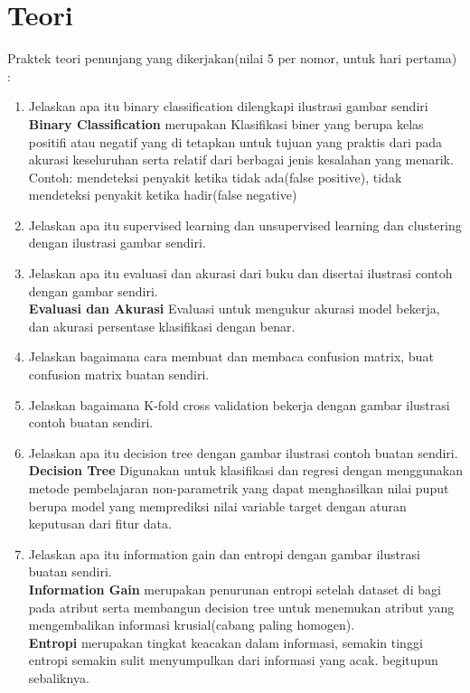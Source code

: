 \section{Teori}
Praktek teori penunjang yang dikerjakan(nilai 5 per nomor, untuk hari pertama) :
\begin{enumerate}
	\item
	      Jelaskan apa itu binary classification dilengkapi ilustrasi gambar sendiri \\
	      \textbf{Binary Classification} merupakan Klasifikasi biner yang berupa kelas positifi atau negatif yang di tetapkan untuk tujuan yang praktis dari pada akurasi keseluruhan serta relatif dari berbagai jenis kesalahan yang menarik.\\

	      Contoh: mendeteksi penyakit ketika tidak ada(false positive), tidak mendeteksi penyakit ketika hadir(false negative)
	\item
	      Jelaskan apa itu supervised learning dan unsupervised learning dan clustering dengan ilustrasi gambar sendiri.
	\item
	      Jelaskan apa itu evaluasi dan akurasi dari buku dan disertai ilustrasi contoh dengan gambar sendiri.\\
	      \textbf{Evaluasi dan Akurasi} Evaluasi untuk mengukur akurasi model bekerja, dan akurasi persentase klasifikasi dengan benar.
	\item
	      Jelaskan bagaimana cara membuat dan membaca confusion matrix, buat confusion matrix buatan sendiri.
	\item
	      Jelaskan bagaimana K-fold cross validation bekerja dengan gambar ilustrasi contoh buatan sendiri.
	\item
	      Jelaskan apa itu decision tree dengan gambar ilustrasi contoh buatan sendiri.\\
	      \textbf{Decision Tree} Digunakan untuk klasifikasi dan regresi dengan menggunakan metode pembelajaran non-parametrik yang dapat menghasilkan nilai puput berupa model yang memprediksi nilai variable target dengan aturan keputusan dari fitur data.
	\item
	      Jelaskan apa itu information gain dan entropi dengan gambar ilustrasi buatan sendiri.\\
	      \textbf{Information Gain} merupakan penurunan entropi setelah dataset di bagi  pada atribut serta membangun decision tree untuk menemukan atribut yang mengembalikan informasi krusial(cabang paling homogen).\\
	      \textbf{Entropi} merupakan tingkat keacakan dalam informasi, semakin tinggi entropi semakin sulit menyumpulkan dari informasi yang acak. begitupun sebaliknya.
\end{enumerate}

